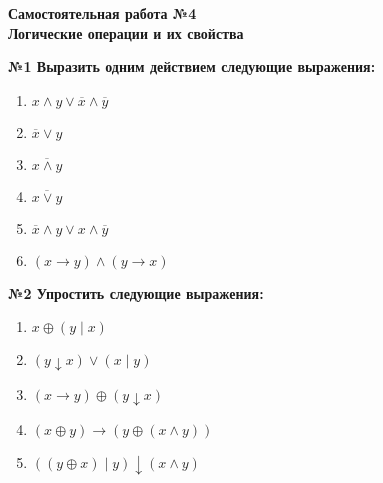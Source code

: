 



    \begin{center}
        \textbf{
            Самостоятельная работа №4\\Логические операции и их свойства
        }
    \end{center}

    \begin{center}
        \textbf{№1 Выразить одним действием следующие выражения:}
    \end{center}

    \begin{minipage}[t]{0.4\textwidth}
        \begin{enumerate}
            \item $x \wedge y \vee \overline x \wedge \overline y$
            \item $\overline x \vee y$
            \item $\overline{x \wedge y}$
        \end{enumerate}
    \end{minipage}
    \begin{minipage}[t]{0.4\textwidth}
        \begin{enumerate}
            \setcounter{enumi}{3}
            \item $\overline{x \vee y}$
            \item $\overline x \wedge y \vee x \wedge \overline y$
            \item $(x \rightarrow y) \wedge (y \rightarrow x)$
        \end{enumerate}
    \end{minipage}

    \begin{center}
        \textbf{№2 Упростить следующие выражения:}
    \end{center}

    \begin{enumerate}
        \item $x \oplus (y \mid x)$
        \item $(y \downarrow x) \vee (x \mid y)$
        \item $(x \rightarrow y) \oplus (y \downarrow x)$
        \item $(x \oplus y) \rightarrow (y \oplus (x \wedge y))$
        \item $((y \oplus x) \mid y) \downarrow (x \wedge y)$
    \end{enumerate}
